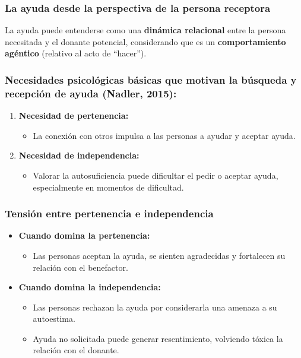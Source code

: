\documentclass[
]{book}
\providecommand{\tightlist}{%
  \setlength{\itemsep}{0pt}\setlength{\parskip}{0pt}}
\begin{document}
\subsubsection{La ayuda desde la perspectiva de la persona receptora}\label{la-ayuda-desde-la-perspectiva-de-la-persona-receptora}

La ayuda puede entenderse como una \textbf{dinámica relacional} entre la persona necesitada y el donante potencial, considerando que es un \textbf{comportamiento agéntico} (relativo al acto de ``hacer'').

\subsubsection{Necesidades psicológicas básicas que motivan la búsqueda y recepción de ayuda (Nadler, 2015):}\label{necesidades-psicoluxf3gicas-buxe1sicas-que-motivan-la-buxfasqueda-y-recepciuxf3n-de-ayuda-nadler-2015}

\begin{enumerate}
\def\labelenumi{\arabic{enumi}.}
\tightlist
\item
  \textbf{Necesidad de pertenencia:}

  \begin{itemize}
  \tightlist
  \item
    La conexión con otros impulsa a las personas a ayudar y aceptar ayuda.
  \end{itemize}
\item
  \textbf{Necesidad de independencia:}

  \begin{itemize}
  \tightlist
  \item
    Valorar la autosuficiencia puede dificultar el pedir o aceptar ayuda, especialmente en momentos de dificultad.
  \end{itemize}
\end{enumerate}

\subsubsection{Tensión entre pertenencia e independencia}\label{tensiuxf3n-entre-pertenencia-e-independencia}

\begin{itemize}
\tightlist
\item
  \textbf{Cuando domina la pertenencia:}

  \begin{itemize}
  \tightlist
  \item
    Las personas aceptan la ayuda, se sienten agradecidas y fortalecen su relación con el benefactor.
  \end{itemize}
\item
  \textbf{Cuando domina la independencia:}

  \begin{itemize}
  \tightlist
  \item
    Las personas rechazan la ayuda por considerarla una amenaza a su autoestima.
  \item
    Ayuda no solicitada puede generar resentimiento, volviendo tóxica la relación con el donante.
  \end{itemize}
\end{itemize}
\end{document}
